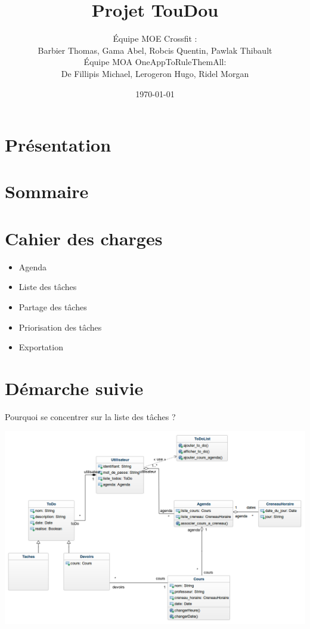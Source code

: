 \documentclass[french]{beamer}
\title{Projet TouDou}
\author{Équipe MOE Crossfit : \\Barbier Thomas, Gama Abel, Robcis Quentin, Pawlak Thibault \\
\vspace{0.5}
Équipe MOA OneAppToRuleThemAll: \\De Fillipis Michael, Lerogeron Hugo, Ridel Morgan }
\institute[]{INSA de Rouen}
\date{\today}
\begin{document}
\section{Présentation}
\begin{frame}
\titlepage
\end{frame}

\section{Sommaire}
\begin{frame}
\tableofcontents
\end{frame}

\section{Cahier des charges}
\begin{frame}
\begin{itemize}
  \item Agenda
  \item Liste des tâches
  \item Partage des tâches
  \item Priorisation des tâches
  \item Exportation
\end{itemize}
\end{frame}

\section{Démarche suivie}
\begin{frame}
  \begin{center}
    Pourquoi se concentrer sur la liste des tâches ?
  \begin{minipage}[c]{0.6\linewidth}%
   \includegraphics[width=1\linewidth]{mdd}  %
  \end{minipage}
\end{center}
\end{frame}
\end{document}
